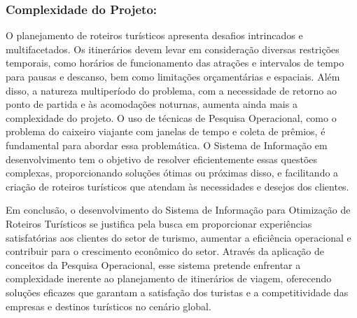 \subsubsection{Complexidade do Projeto:}
O planejamento de roteiros turísticos apresenta desafios intrincados e multifacetados. Os itinerários devem levar em consideração diversas restrições temporais, como horários de funcionamento das atrações e intervalos de tempo para pausas e descanso, bem como limitações orçamentárias e espaciais. Além disso, a natureza multiperíodo do problema, com a necessidade de retorno ao ponto de partida e às acomodações noturnas, aumenta ainda mais a complexidade do projeto. O uso de técnicas de Pesquisa Operacional, como o problema do caixeiro viajante com janelas de tempo e coleta de prêmios, é fundamental para abordar essa problemática. O Sistema de Informação em desenvolvimento tem o objetivo de resolver eficientemente essas questões complexas, proporcionando soluções ótimas ou próximas disso, e facilitando a criação de roteiros turísticos que atendam às necessidades e desejos dos clientes.

Em conclusão, o desenvolvimento do Sistema de Informação para Otimização de Roteiros Turísticos se justifica pela busca em proporcionar experiências satisfatórias aos clientes do setor de turismo, aumentar a eficiência operacional e contribuir para o crescimento econômico do setor. Através da aplicação de conceitos da Pesquisa Operacional, esse sistema pretende enfrentar a complexidade inerente ao planejamento de itinerários de viagem, oferecendo soluções eficazes que garantam a satisfação dos turistas e a competitividade das empresas e destinos turísticos no cenário global.